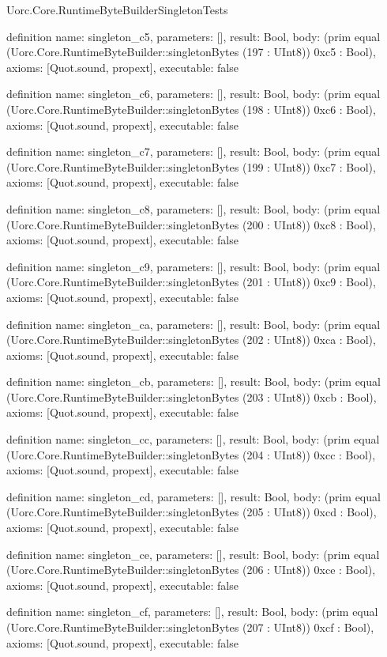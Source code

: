 \begin{lexlean}{Uorc.Core.RuntimeByteBuilderSingletonTests}
\begin{semanticmodule}
definition{
  name: singleton_c5,
  parameters: [],
  result: Bool,
  body: (prim equal (Uorc.Core.RuntimeByteBuilder::singletonBytes (197 : UInt8)) 0xc5 : Bool),
  axioms: [Quot.sound, propext],
  executable: false
}

definition{
  name: singleton_c6,
  parameters: [],
  result: Bool,
  body: (prim equal (Uorc.Core.RuntimeByteBuilder::singletonBytes (198 : UInt8)) 0xc6 : Bool),
  axioms: [Quot.sound, propext],
  executable: false
}

definition{
  name: singleton_c7,
  parameters: [],
  result: Bool,
  body: (prim equal (Uorc.Core.RuntimeByteBuilder::singletonBytes (199 : UInt8)) 0xc7 : Bool),
  axioms: [Quot.sound, propext],
  executable: false
}

definition{
  name: singleton_c8,
  parameters: [],
  result: Bool,
  body: (prim equal (Uorc.Core.RuntimeByteBuilder::singletonBytes (200 : UInt8)) 0xc8 : Bool),
  axioms: [Quot.sound, propext],
  executable: false
}

definition{
  name: singleton_c9,
  parameters: [],
  result: Bool,
  body: (prim equal (Uorc.Core.RuntimeByteBuilder::singletonBytes (201 : UInt8)) 0xc9 : Bool),
  axioms: [Quot.sound, propext],
  executable: false
}

definition{
  name: singleton_ca,
  parameters: [],
  result: Bool,
  body: (prim equal (Uorc.Core.RuntimeByteBuilder::singletonBytes (202 : UInt8)) 0xca : Bool),
  axioms: [Quot.sound, propext],
  executable: false
}

definition{
  name: singleton_cb,
  parameters: [],
  result: Bool,
  body: (prim equal (Uorc.Core.RuntimeByteBuilder::singletonBytes (203 : UInt8)) 0xcb : Bool),
  axioms: [Quot.sound, propext],
  executable: false
}

definition{
  name: singleton_cc,
  parameters: [],
  result: Bool,
  body: (prim equal (Uorc.Core.RuntimeByteBuilder::singletonBytes (204 : UInt8)) 0xcc : Bool),
  axioms: [Quot.sound, propext],
  executable: false
}

definition{
  name: singleton_cd,
  parameters: [],
  result: Bool,
  body: (prim equal (Uorc.Core.RuntimeByteBuilder::singletonBytes (205 : UInt8)) 0xcd : Bool),
  axioms: [Quot.sound, propext],
  executable: false
}

definition{
  name: singleton_ce,
  parameters: [],
  result: Bool,
  body: (prim equal (Uorc.Core.RuntimeByteBuilder::singletonBytes (206 : UInt8)) 0xce : Bool),
  axioms: [Quot.sound, propext],
  executable: false
}

definition{
  name: singleton_cf,
  parameters: [],
  result: Bool,
  body: (prim equal (Uorc.Core.RuntimeByteBuilder::singletonBytes (207 : UInt8)) 0xcf : Bool),
  axioms: [Quot.sound, propext],
  executable: false
}


\end{semanticmodule}
\end{lexlean}
